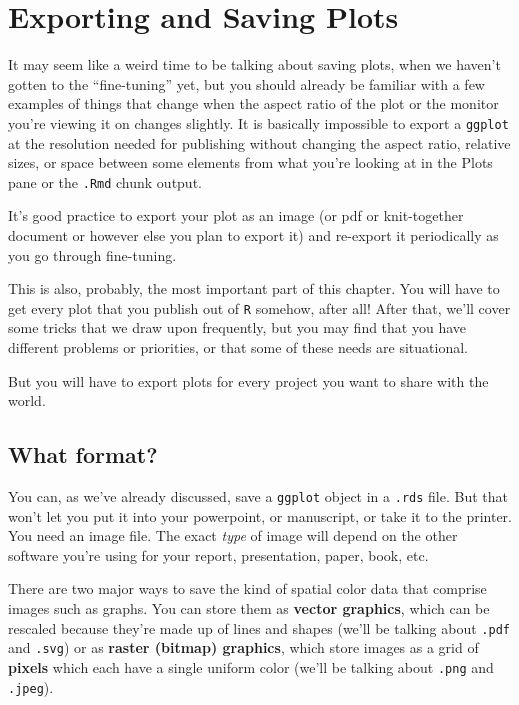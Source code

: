 \documentclass[
]{book}
\begin{document}
\hypertarget{exporting-and-saving-plots}{%
\section{Exporting and Saving Plots}\label{exporting-and-saving-plots}}

It may seem like a weird time to be talking about saving plots, when we haven't gotten to the ``fine-tuning'' yet, but you should already be familiar with a few examples of things that change when the aspect ratio of the plot or the monitor you're viewing it on changes slightly. It is basically impossible to export a \texttt{ggplot} at the resolution needed for publishing without changing the aspect ratio, relative sizes, or space between some elements from what you're looking at in the Plots pane or the \texttt{.Rmd} chunk output.

It's good practice to export your plot as an image (or pdf or knit-together document or however else you plan to export it) and re-export it periodically as you go through fine-tuning.

This is also, probably, the most important part of this chapter. You will have to get every plot that you publish out of \texttt{R} somehow, after all! After that, we'll cover some tricks that we draw upon frequently, but you may find that you have different problems or priorities, or that some of these needs are situational.

But you will have to export plots for every project you want to share with the world.

\hypertarget{what-format}{%
\subsection{What format?}\label{what-format}}

You can, as we've already discussed, save a \texttt{ggplot} object in a \texttt{.rds} file. But that won't let you put it into your powerpoint, or manuscript, or take it to the printer. You need an image file. The exact \emph{type} of image will depend on the other software you're using for your report, presentation, paper, book, etc.

There are two major ways to save the kind of spatial color data that comprise images such as graphs. You can store them as \textbf{vector graphics}, which can be rescaled because they're made up of lines and shapes (we'll be talking about \texttt{.pdf} and \texttt{.svg}) or as \textbf{raster (bitmap) graphics}, which store images as a grid of \textbf{pixels} which each have a single uniform color (we'll be talking about \texttt{.png} and \texttt{.jpeg}).
\end{document}
